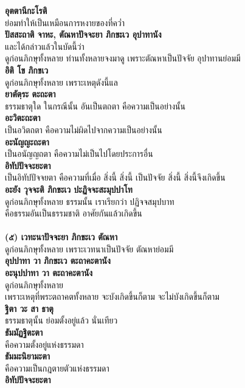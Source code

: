 \documentclass[12pt]{article}
\begin{document}
\textbf{อุตตานีกะโรติ}\\
\indent ย่อมทำให้เป็นเหมือนการหงายของที่คว่ำ\\
\textbf{ปัสสะถาติ จาหะ, ตัณหาปัจจะยา ภิกขะเว อุปาทานัง}\\
\indent และได้กล่าวแล้วในบัดนี้ว่า \\
\indent ดูก่อนภิกษุทั้งหลาย ท่านทั้งหลายจงมาดู เพราะตัณหาเป็นปัจจัย อุปาทานย่อมมี\\
\textbf{อิติ โข ภิกขเว}\\
\indent ดูก่อนภิกษุทั้งหลาย เพราะเหตุดังนี้แล\\
\textbf{ยาตัตฺระ ตะถะตา}\\
\indent ธรรมธาตุใด ในกรณีนั้น อันเป็นตถตา คือความเป็นอย่างนั้น\\
\textbf{อะวิตะถะตา}\\
\indent เป็นอวิตถตา คือความไม่ผิดไปจากความเป็นอย่างนั้น\\
\textbf{อะนัญญะถะตา}\\
\indent เป็นอนัญญถตา คือความไม่เป็นไปโดยประการอื่น\\
\textbf{อิทัปปัจจะยะตา}\\
\indent เป็นอิทัปปัจจยตา คือความที่เมื่อ สิ่งนี้ สิ่งนี้ เป็นปัจจัย สิ่งนี้ สิ่งนี้จึงเกิดขึ้น\\
\textbf{อะยัง วุจจะติ ภิกขะเว ปะฏิจจะสะมุปปาโท}\\
\indent ดูก่อนภิกษุทั้งหลาย ธรรมนั้น เราเรียกว่า ปฏิจจสมุปบาท \\
\indent คือธรรมอันเป็นธรรมชาติ อาศัยกันแล้วเกิดขึ้น\\
\\
\textbf{(๕) เวทะนาปัจจะยา ภิกขะเว ตัณหา}\\
\indent ดูก่อนภิกษุทั้งหลาย เพราะเวทนาเป็นปัจจัย ตัณหาย่อมมี\\
\textbf{อุปปาทา วา ภิกขะเว ตะถาคะตานัง\\
อะนุปปาทา วา ตะถาคะตานัง}\\
\indent ดูก่อนภิกษุทั้งหลาย\\
\indent เพราะเหตุที่พระตถาคตทั้งหลาย จะบังเกิดขึ้นก็ตาม จะไม่บังเกิดขึ้นก็ตาม\\
\textbf{ฐิตา วะ สา ธาตุ}\\
\indent ธรรมธาตุนั้น ย่อมตั้งอยู่แล้ว นั่นเทียว\\
\textbf{ธัมมัฏฐิตะตา}\\
\indent คือความตั้งอยู่แห่งธรรมดา\\
\textbf{ธัมมะนิยามะตา}\\
\indent คือความเป็นกฎตายตัวแห่งธรรมดา\\
\textbf{อิทัปปัจจะยะตา}\\
\end{document}
